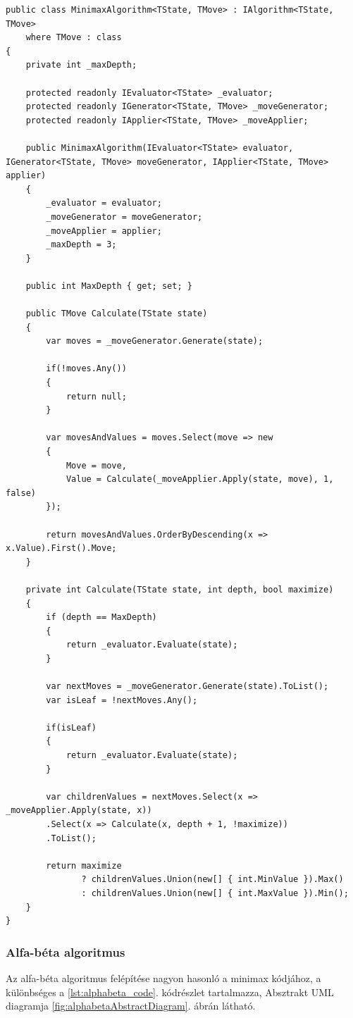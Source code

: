 \documentclass[twoside, a4paper, 12pt]{article}
\begin{document}
\begin{lstlisting}[caption=Minimax (egszerűsített) kódja, label=lst:minimax_code, float]
public class MinimaxAlgorithm<TState, TMove> : IAlgorithm<TState, TMove>
	where TMove : class
{
	private int _maxDepth;
	
	protected readonly IEvaluator<TState> _evaluator;
	protected readonly IGenerator<TState, TMove> _moveGenerator;
	protected readonly IApplier<TState, TMove> _moveApplier;
	
	public MinimaxAlgorithm(IEvaluator<TState> evaluator, IGenerator<TState, TMove> moveGenerator, IApplier<TState, TMove> applier)
	{
		_evaluator = evaluator;
		_moveGenerator = moveGenerator;
		_moveApplier = applier;
		_maxDepth = 3;
	}
	
	public int MaxDepth { get; set; }
	
	public TMove Calculate(TState state)
	{
		var moves = _moveGenerator.Generate(state);
	
		if(!moves.Any())
		{
			return null;
		}
		
		var movesAndValues = moves.Select(move => new
		{
			Move = move,
			Value = Calculate(_moveApplier.Apply(state, move), 1, false)
		});
		
		return movesAndValues.OrderByDescending(x => x.Value).First().Move;
	}
	
	private int Calculate(TState state, int depth, bool maximize)
	{
		if (depth == MaxDepth)
		{
			return _evaluator.Evaluate(state);
		}
		
		var nextMoves = _moveGenerator.Generate(state).ToList();
		var isLeaf = !nextMoves.Any();
		
		if(isLeaf)
		{
			return _evaluator.Evaluate(state);
		}
		
		var childrenValues = nextMoves.Select(x => _moveApplier.Apply(state, x))
		.Select(x => Calculate(x, depth + 1, !maximize))
		.ToList();
		
		return maximize
		       ? childrenValues.Union(new[] { int.MinValue }).Max()
               : childrenValues.Union(new[] { int.MaxValue }).Min();
	}
}
\end{lstlisting}

\subsubsection{Alfa-béta algoritmus}
Az alfa-béta algoritmus felépítése nagyon hasonló a minimax kódjához, a különbséges a \ref{lst:alphabeta_code}. kódrészlet tartalmazza, Absztrakt UML diagramja \ref{fig:alphabetaAbstractDiagram}. ábrán látható.
\end{document}

